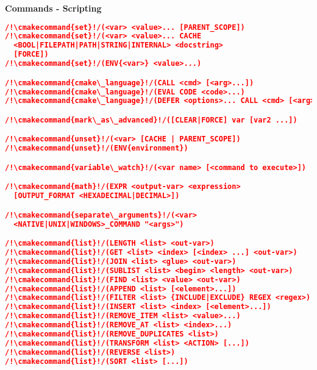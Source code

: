 \documentclass{article}
\newcommand{\cmakecommand}[1]{{\href{https://cmake.org/cmake/help/v3.20/command/#1.html}{#1}}}
\begin{document}
\pagebreak
\begin{minipage}[t]{0.18\linewidth}
\textbf{Commands - Scripting}
\begin{lstlisting}[language=CMake]
/!\cmakecommand{set}!/(<var> <value>... [PARENT_SCOPE])
/!\cmakecommand{set}!/(<var> <value>... CACHE
  <BOOL|FILEPATH|PATH|STRING|INTERNAL> <docstring>
  [FORCE])
/!\cmakecommand{set}!/(ENV{<var>} <value>...)

/!\cmakecommand{cmake\_language}!/(CALL <cmd> [<arg>...])
/!\cmakecommand{cmake\_language}!/(EVAL CODE <code>...)
/!\cmakecommand{cmake\_language}!/(DEFER <options>... CALL <cmd> [<arg>...])

/!\cmakecommand{mark\_as\_advanced}!/([CLEAR|FORCE] var [var2 ...])

/!\cmakecommand{unset}!/(<var> [CACHE | PARENT_SCOPE])
/!\cmakecommand{unset}!/(ENV{environment})

/!\cmakecommand{variable\_watch}!/(<var name> [<command to execute>])

/!\cmakecommand{math}!/(EXPR <output-var> <expression>
  [OUTPUT_FORMAT <HEXADECIMAL|DECIMAL>])

/!\cmakecommand{separate\_arguments}!/(<var>
  <NATIVE|UNIX|WINDOWS>_COMMAND "<args>")

/!\cmakecommand{list}!/(LENGTH <list> <out-var>)
/!\cmakecommand{list}!/(GET <list> <index> [<index> ...] <out-var>)
/!\cmakecommand{list}!/(JOIN <list> <glue> <out-var>)
/!\cmakecommand{list}!/(SUBLIST <list> <begin> <length> <out-var>)
/!\cmakecommand{list}!/(FIND <list> <value> <out-var>)
/!\cmakecommand{list}!/(APPEND <list> [<element>...])
/!\cmakecommand{list}!/(FILTER <list> {INCLUDE|EXCLUDE} REGEX <regex>)
/!\cmakecommand{list}!/(INSERT <list> <index> [<element>...])
/!\cmakecommand{list}!/(REMOVE_ITEM <list> <value>...)
/!\cmakecommand{list}!/(REMOVE_AT <list> <index>...)
/!\cmakecommand{list}!/(REMOVE_DUPLICATES <list>)
/!\cmakecommand{list}!/(TRANSFORM <list> <ACTION> [...])
/!\cmakecommand{list}!/(REVERSE <list>)
/!\cmakecommand{list}!/(SORT <list> [...])


\end{lstlisting}
\end{minipage}
\end{document}
